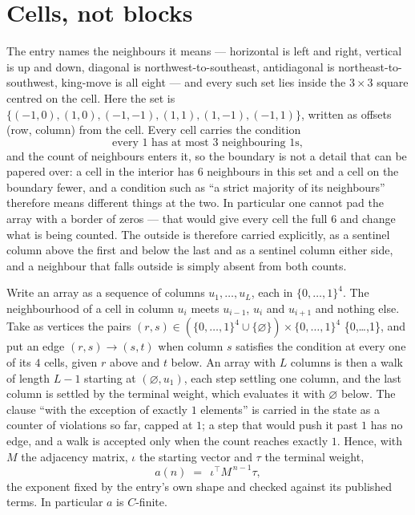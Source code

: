 \documentclass[11pt,a4paper]{article}
\theoremstyle{plain}
\theoremstyle{definition}
\begin{document}
\section{Cells, not blocks}

The entry names the neighbours it means --- horizontal is left and right, vertical is up and
down, diagonal is northwest-to-southeast, antidiagonal is northeast-to-southwest, king-move is
all eight --- and every such set lies inside the $3\times3$ square centred on the cell. Here
the set is $\{(-1,0), (1,0), (-1,-1), (1,1), (1,-1), (-1,1)\}$, written as offsets (row, column) from the cell. Every cell carries
the condition
\[
\text{every 1 has at most 3 neighbouring 1s},
\]
and the count of neighbours enters it, so the boundary is not a detail that can be papered
over: a cell in the interior has $6$ neighbours in this set and a cell on the boundary
fewer, and a condition such as ``a strict majority of its neighbours'' therefore means
different things at the two. In particular one cannot pad the array with a border of zeros ---
that would give every cell the full $6$ and change what is being counted. The outside is
therefore carried
explicitly, as a sentinel column above the first and below the last and as a sentinel column
either side, and a neighbour that falls outside is simply absent from both counts.

Write an array as a sequence of columns $u_1,\dots,u_L$, each in
$\{0,\dots,1\}^{4}$. The neighbourhood of a cell in column $u_i$ meets $u_{i-1}$,
$u_i$ and $u_{i+1}$ and nothing else. Take as vertices the pairs
$(r,s)\in(\{0,\dots,1\}^{4}\cup\{\varnothing\})\times\{0,\dots,1\}^{4}$ \times \{0,\dots,1\},
and put an edge $(r,s)\to(s,t)$ when column $s$ satisfies the condition at every one of its
$4$ cells, given $r$ above and $t$ below. An array with $L$ columns is then a walk of length
$L-1$ starting at $(\varnothing,u_1)$, each step settling one column, and the last column is
settled by the terminal weight, which evaluates it with $\varnothing$ below. The clause ``with the exception of exactly $1$ elements'' is carried in
the state as a counter of violations so far, capped at $1$; a step that would push it past
$1$ has no edge, and a walk is accepted only when the count reaches exactly $1$. Hence,
with $M$ the adjacency matrix, $\iota$ the starting vector and $\tau$ the terminal weight,
\[
a(n)\;=\;\,\iota^{\!\top}M^{\,n-1}\tau ,
\]
the exponent fixed by the entry's own shape and checked against its published terms. In
particular $a$ is $C$-finite.
\end{document}
